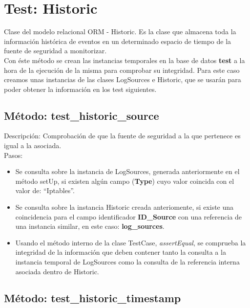 

\section{\quad Test: Historic}

Clase del modelo relacional ORM - Historic. Es la clase que almacena toda la información histórica de eventos en un determinado espacio de tiempo de la fuente de seguridad a monitorizar.\\

Con éste método se crean las instancias temporales en la base de datos \textbf{test} a la hora de la ejecución de la misma para comprobar su integridad. Para este caso creamos unas instancias de las clases LogSources e Historic, que se usarán para poder obtener la información en los test siguientes.\\



\subsection{\quad Método: test\_historic\_source}

Descripción: Comprobación de que la fuente de seguridad a la que pertenece es igual a la asociada.\\
Pasos:
\begin{itemize}
\item Se consulta sobre la instancia de LogSources, generada anteriormente en el método setUp, si existen algún campo (\textbf{Type}) cuyo valor coincida con el valor de: ``Iptables''.
\item Se consulta sobre la instancia Historic creada anteriomente, si existe una coincidencia para el campo identificador \textbf{ID\_Source} con una referencia de una instancia similar, en este caso: \textbf{log\_sources}.
\item Usando el método interno de la clase TestCase, \emph{assertEqual}, se comprueba la integridad de la información que deben contener tanto la consulta a la instancia temporal de LogSources como la consulta de la referencia interna asociada dentro de Historic.
\end{itemize}



\subsection{\quad Método: test\_historic\_timestamp}


